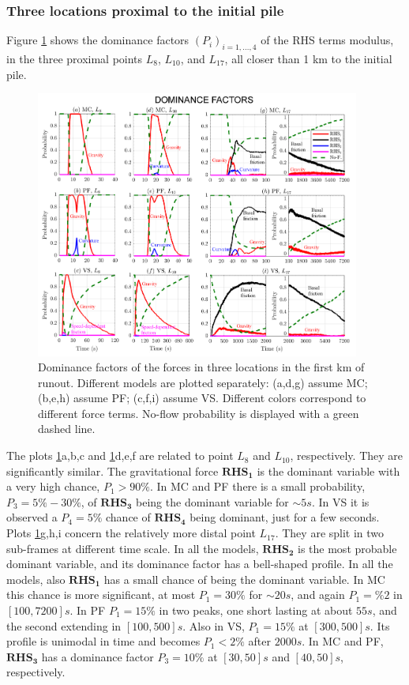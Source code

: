 \documentclass{article}
\begin{document}
\subsubsection{Three locations proximal to the initial pile}
Figure \ref{fig:Colima-Pr1} shows the dominance factors $(P_i)_{i=1,\dots,4}$ of the RHS terms modulus, in the three proximal points $L_{8}$, $L_{10}$, and $L_{17}$, all closer than 1 km to the initial pile.
\begin{figure}[H]
         \centering
        \includegraphics[width=0.95\textwidth]{figures/Colima/Pr1_total.png}
        \caption{Dominance factors of the forces in three locations in the first km of runout. Different models are plotted separately: (a,d,g) assume MC; (b,e,h) assume PF; (c,f,i) assume VS. Different colors correspond to different force terms. No-flow probability is displayed with a green dashed line.}
        \label{fig:Colima-Pr1}
\end{figure}
The plots \ref{fig:Colima-Pr1}a,b,c and \ref{fig:Colima-Pr1}d,e,f are related to point $L_8$ and $L_{10}$, respectively. They are significantly similar. The gravitational force $\boldsymbol{RHS_1}$ is the dominant variable with a very high chance, $P_1>90\%$. In MC and PF there is a small probability, $P_3=5\%-30\%$, of $\boldsymbol{RHS_3}$ being the dominant variable for $\sim 5 s$. In VS it is observed a $P_4=5\%$ chance of $\boldsymbol{RHS_4}$ being dominant, just for a few seconds. Plots \ref{fig:Colima-Pr1}g,h,i concern the relatively more distal point $L_{17}$. They are split in two sub-frames at different time scale. In all the models, $\boldsymbol{RHS_2}$ is the most probable dominant variable, and its dominance factor has a bell-shaped profile. In all the models, also $\boldsymbol{RHS_1}$ has a small chance of being the dominant variable. In MC this chance is more significant, at most $P_1=30\%$ for $\sim 20 s$, and again $P_1=\%2$ in $[100, 7200] s$. In PF $P_1=15\%$ in two peaks, one short lasting at about $55 s$, and the second extending in $[100,500] s$. Also in VS, $P_1=15\%$ at $[300, 500] s$. Its profile is unimodal in time and becomes $P_1<2\%$ after $2000 s$. In MC and PF, $\boldsymbol{RHS_3}$ has a dominance factor $P_3=10\%$ at $[30, 50] s$ and $[40, 50] s$, respectively.
\end{document}
